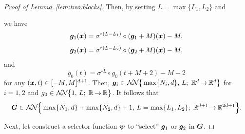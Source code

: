\documentclass[nohyperref]{article}
\theoremstyle{plain}
\theoremstyle{definition}
\theoremstyle{remark}
\begin{document}
\begin{proof}[Proof of Lemma~\ref{lem:two:blocks}]
	
		
		Then, by setting $L=\max\{L_1,L_2\}$ and 

		we have
		\begin{equation*}
			{\bm{g}}_1({\bm{x}})=\sigma^{\circ (L-L_1)}\circ ({\bm{g}}_1+M) ({\bm{x}}) -M,
		\end{equation*}
		\begin{equation*}
			{\bm{g}}_2({\bm{x}})=\sigma^{\circ (L-L_2)}\circ ({\bm{g}}_2+M) ({\bm{x}}) -M,
		\end{equation*}
		and 
		\begin{equation*}
			g_0(t)=\sigma^{\circ L}\circ g_0(t+M+2)-M-2
		\end{equation*}
		for any $({\bm{x}},t)\in [-M,M]^{d+1}$.
		Then, 
		$\bmg_i\in \nn[\big]{\max\{N_i,d\}}{L}{d}{d}$ for $i=1,2$ and 
		 $g_0\in \nnOneD[\big]{1}{L}{\R}{\R}$.
		It follows that 
		\begin{equation*}
			\bmG\in \nn[\Big]{\max\{N_1,d\}+\max\{N_2,d\}+1}{L=\max\{L_1,L_2\}}{d+1}{2d+1}.
		\end{equation*}
		
		Next, let construct a selector function ${\bm{\psi}}$ to ``select'' ${\bm{g}}_1$ or ${\bm{g}}_2$ in ${\bm{G}}$.	
		


\end{proof}
\end{document}
